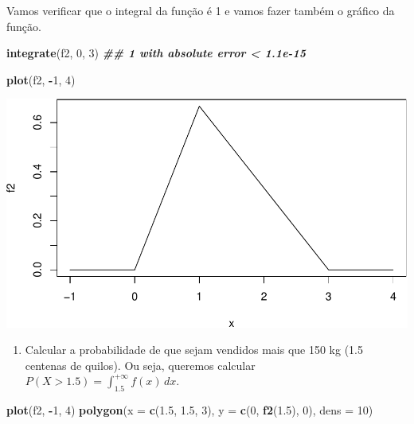 \documentclass[
]{book}
\newenvironment{Shaded}{\begin{snugshade}}{\end{snugshade}}
\newcommand{\AttributeTok}[1]{\textcolor[rgb]{0.13,0.29,0.53}{#1}}
\newcommand{\DecValTok}[1]{\textcolor[rgb]{0.00,0.00,0.81}{#1}}
\newcommand{\DocumentationTok}[1]{\textcolor[rgb]{0.56,0.35,0.01}{\textbf{\textit{#1}}}}
\newcommand{\FloatTok}[1]{\textcolor[rgb]{0.00,0.00,0.81}{#1}}
\newcommand{\FunctionTok}[1]{\textcolor[rgb]{0.13,0.29,0.53}{\textbf{#1}}}
\newcommand{\NormalTok}[1]{#1}
\newcommand{\SpecialCharTok}[1]{\textcolor[rgb]{0.81,0.36,0.00}{\textbf{#1}}}
\providecommand{\tightlist}{%
  \setlength{\itemsep}{0pt}\setlength{\parskip}{0pt}}
\begin{document}
Vamos verificar que o integral da função é 1 e vamos fazer também o gráfico da função.

\begin{Shaded}
\begin{Highlighting}[]
\FunctionTok{integrate}\NormalTok{(f2, }\DecValTok{0}\NormalTok{, }\DecValTok{3}\NormalTok{)}
\DocumentationTok{\#\# 1 with absolute error \textless{} 1.1e{-}15}
\end{Highlighting}
\end{Shaded}

\begin{Shaded}
\begin{Highlighting}[]
\FunctionTok{plot}\NormalTok{(f2, }\SpecialCharTok{{-}}\DecValTok{1}\NormalTok{, }\DecValTok{4}\NormalTok{)}
\end{Highlighting}
\end{Shaded}

\includegraphics{introR_files/figure-latex/unnamed-chunk-236-1.pdf}

\begin{enumerate}
\def\labelenumi{(\alph{enumi})}
\tightlist
\item
  Calcular a probabilidade de que sejam vendidos mais que 150 kg (1.5 centenas de quilos). Ou seja, queremos calcular \(P(X>1.5) = \int_{1.5}^{+\infty}f(x)\,dx\).
\end{enumerate}

\begin{Shaded}
\begin{Highlighting}[]
\FunctionTok{plot}\NormalTok{(f2, }\SpecialCharTok{{-}}\DecValTok{1}\NormalTok{, }\DecValTok{4}\NormalTok{)}
\FunctionTok{polygon}\NormalTok{(}\AttributeTok{x =} \FunctionTok{c}\NormalTok{(}\FloatTok{1.5}\NormalTok{, }\FloatTok{1.5}\NormalTok{, }\DecValTok{3}\NormalTok{), }\AttributeTok{y =} \FunctionTok{c}\NormalTok{(}\DecValTok{0}\NormalTok{, }\FunctionTok{f2}\NormalTok{(}\FloatTok{1.5}\NormalTok{), }\DecValTok{0}\NormalTok{), }\AttributeTok{dens =} \DecValTok{10}\NormalTok{)}
\end{Highlighting}
\end{Shaded}
\end{document}
